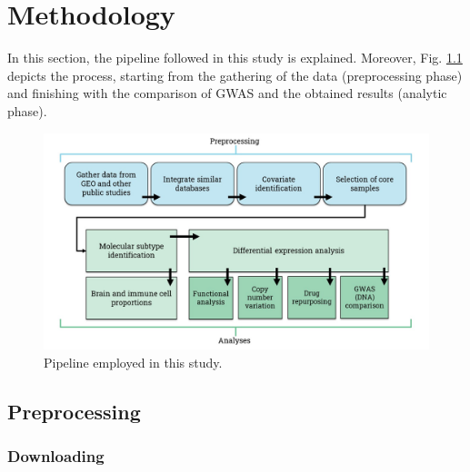 \chapter{Methodology}
\label{chapter:Methods}

In this section, the pipeline followed in this study is explained. Moreover, Fig. \ref{fig:pipeline} depicts the process, starting from the gathering of the data (preprocessing phase) and finishing with the comparison of GWAS and the obtained results (analytic phase).

\begin{figure}[h]
    \centerline{\includegraphics[width = 15cm]{Figures/pipeline.jpg}}
\caption{Pipeline employed in this study.}
\label{fig:pipeline}
\end{figure}

\section{Preprocessing}
\subsection{Downloading}

